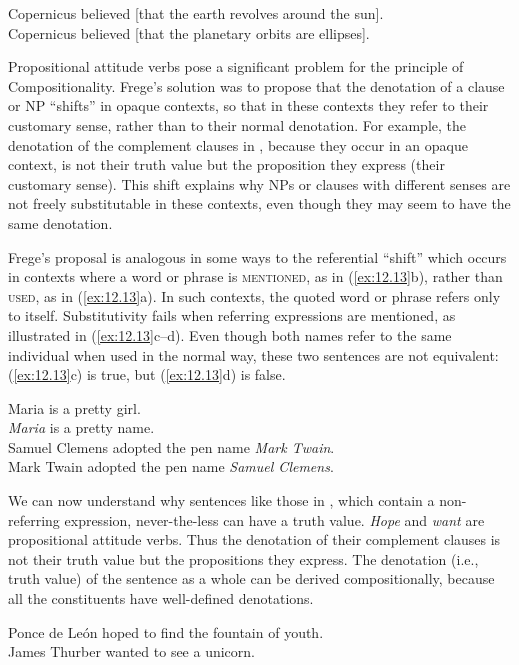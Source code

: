 \ea \label{ex:12.12}
\ea Copernicus believed [that the earth revolves around the sun].\\
\ex Copernicus believed [that the planetary orbits are ellipses].
                       \z
\z


Propositional attitude verbs pose a significant problem for the principle of Compositionality. Frege’s solution was to propose that the denotation of a clause or NP “shifts” in opaque contexts, so that in these contexts they refer to their customary sense, rather than to their normal denotation. For example, the denotation of the complement clauses in , because they occur in an opaque context, is not their truth value but the proposition they express (their customary sense). This shift explains why NPs or clauses with different senses are not freely substitutable in these contexts, even though they may seem to have the same denotation.



Frege’s proposal is analogous in some ways to the referential “shift” which occurs in contexts where a word or phrase is \textsc{mentioned}, as in (\ref{ex:12.13}b), rather than \textsc{used}, as in (\ref{ex:12.13}a). In such contexts, the quoted word or phrase refers only to itself. Substitutivity fails when referring expressions are mentioned, as illustrated in (\ref{ex:12.13}c--d). Even though both names refer to the same individual when used in the normal way, these two sentences are not equivalent: (\ref{ex:12.13}c) is true, but (\ref{ex:12.13}d) is false.


\ea \label{ex:12.13}
\ea Maria is a pretty girl.\\
\ex \textit{Maria} is a pretty name.\\
\ex Samuel Clemens adopted the pen name \textit{Mark Twain}.\\
\ex Mark Twain adopted the pen name \textit{Samuel Clemens}.
                       \z
\z


We can now understand why sentences like those in , which contain a non-referring expression, never-the-less can have a truth value. \textit{Hope} and \textit{want} are propositional attitude verbs. Thus the denotation of their complement clauses is not their truth value but the propositions they express. The denotation (i.e., truth value) of the sentence as a whole can be derived compositionally, because all the constituents have well-defined denotations.


\ea \label{ex:12.14}
\ea Ponce de León hoped to find the fountain of youth.\\
\ex James Thurber wanted to see a unicorn.
                       \z
\z

